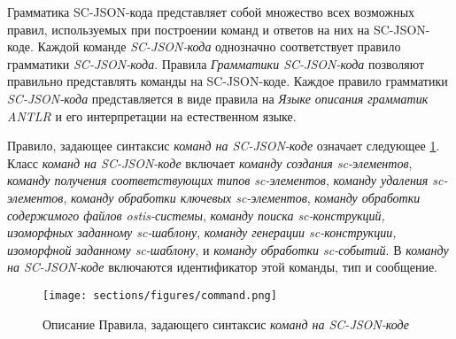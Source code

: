 Грамматика SC-JSON-кода представляет собой множество всех возможных правил, используемых при построении команд и ответов на них на SC-JSON-коде. Каждой команде \textit{SC-JSON-кода} однозначно соответствует правило грамматики \textit{SC-JSON-кода}. Правила \textit{Грамматики SC-JSON-кода} позволяют правильно представлять команды на SC-JSON-коде. Каждое правило грамматики \textit{SC-JSON-кода} представляется в виде правила на \textit{Языке описания грамматик ANTLR} и его интерпретации на естественном языке.

\begin{SCn}
\begin{scnindent}
\end{scnindent}
\begin{scnindent}
\end{scnindent}
\begin{scnindent}
\end{scnindent}
\begin{scnindent}
\end{scnindent}
\end{SCn}

Правило, задающее синтаксис \textit{команд на SC-JSON-коде} означает следующее \ref{fig:command}. Класс \textit{команд на SC-JSON-коде} включает \textit{команду создания sc-элементов}, \textit{команду получения соответствующих типов sc-элементов}, \textit{команду удаления sc-элементов}, \textit{команду обработки ключевых sc-элементов}, \textit{команду обработки содержимого файлов ostis-системы}, \textit{команду поиска sc-конструкций, изоморфных заданному sc-шаблону}, \textit{команду генерации sc-конструкции, изоморфной заданному sc-шаблону}, и \textit{команду обработки sc-событий}. В \textit{команду на SC-JSON-коде} включаются идентификатор этой команды, тип и сообщение.

\begin{figure}[htbp]
  \center
  \texttt{[image: sections/figures/command.png]}
  \caption{Описание Правила, задающего синтаксис \textit{команд на SC-JSON-коде}}
  \label{fig:command}
\end{figure}

